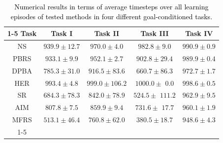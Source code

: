 \documentclass[journal]{IEEEtran}
\begin{document}
\begin{table}[tb]
\caption{\textcolor{black}{Numerical results in terms of average timesteps over all learning episodes of tested methods in four different goal-conditioned tasks.}}
\centering
\setlength{\tabcolsep}{0.8mm}\renewcommand{}
\begin{tabular}{c|c|c|c|c}
\cmidrule[\heavyrulewidth]{1-5}
Task    & Task I                & Task II               & Task III              & Task IV \\
\hline 
NS      & $939.9\pm 12.7$       & $970.0\pm 4.0$        & $982.8\pm 9.0$        & $990.9\pm 0.9$ \\
PBRS    & $933.1\pm 9.9$        & $952.1\pm 2.7$        & $902.8\pm 29.4$       & $989.9\pm 0.4$ \\
DPBA    & $785.3\pm 31.0$       & $916.5\pm 83.6$       & $660.7\pm 86.3$       & $972.7\pm 1.7$ \\
HER     & $993.4\pm 4.8$        & $999.0\pm 106.2$      & $1000.0\pm $ $0.0$    & $998.6\pm 0.5$ \\
SR      & $684.3\pm 78.3$       & $842.0\pm 78.9$       & $524.5\pm $ $111.2$   & $962.9\pm 9.5$ \\
AIM     & $807.8\pm 7.5$        & $859.9\pm 9.4$        & $731.6\pm $ $17.7$    & $960.1\pm 1.9$ \\
MFRS   	& $\bm{513.1\pm 46.4}$  & $\bm{760.8\pm 62.0}$  & $\bm{380.5\pm 18.7}$  & $\bm{948.6\pm 4.3}$ \\

\cmidrule[\heavyrulewidth]{1-5}
\end{tabular}
\label{table:res-steps}
\end{table}
\end{document}
